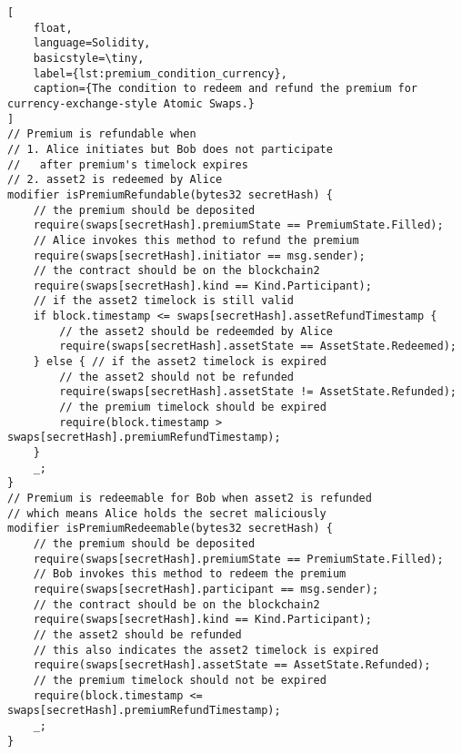 \begin{lstlisting}[
    float,
    language=Solidity, 
    basicstyle=\tiny,
    label={lst:premium_condition_currency},
    caption={The condition to redeem and refund the premium for currency-exchange-style Atomic Swaps.}
]
// Premium is refundable when
// 1. Alice initiates but Bob does not participate
//   after premium's timelock expires
// 2. asset2 is redeemed by Alice
modifier isPremiumRefundable(bytes32 secretHash) {
    // the premium should be deposited
    require(swaps[secretHash].premiumState == PremiumState.Filled);
    // Alice invokes this method to refund the premium
    require(swaps[secretHash].initiator == msg.sender);
    // the contract should be on the blockchain2
    require(swaps[secretHash].kind == Kind.Participant);
    // if the asset2 timelock is still valid
    if block.timestamp <= swaps[secretHash].assetRefundTimestamp {
        // the asset2 should be redeemded by Alice
        require(swaps[secretHash].assetState == AssetState.Redeemed);
    } else { // if the asset2 timelock is expired
        // the asset2 should not be refunded
        require(swaps[secretHash].assetState != AssetState.Refunded);
        // the premium timelock should be expired
        require(block.timestamp > swaps[secretHash].premiumRefundTimestamp);
    }
    _;
}
// Premium is redeemable for Bob when asset2 is refunded
// which means Alice holds the secret maliciously
modifier isPremiumRedeemable(bytes32 secretHash) {
    // the premium should be deposited
    require(swaps[secretHash].premiumState == PremiumState.Filled);
    // Bob invokes this method to redeem the premium
    require(swaps[secretHash].participant == msg.sender);
    // the contract should be on the blockchain2
    require(swaps[secretHash].kind == Kind.Participant);
    // the asset2 should be refunded
    // this also indicates the asset2 timelock is expired
    require(swaps[secretHash].assetState == AssetState.Refunded);
    // the premium timelock should not be expired
    require(block.timestamp <= swaps[secretHash].premiumRefundTimestamp);
    _;
}
\end{lstlisting}

